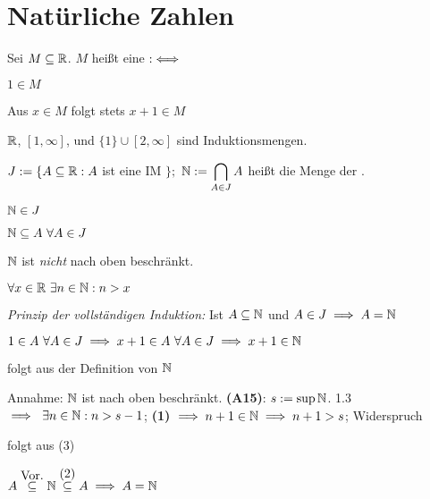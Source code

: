 \documentclass[a4paper,twoside,DIV15,BCOR12mm]{scrbook}
\begin{document}
\chapter{Natürliche Zahlen}

\begin{definition}[Induktionsmengen]
Sei $M \subseteq \mathbb{R}$. $M$ heißt eine   $:\iff$
\begin{liste}
\item $1 \in M$
\item Aus $x \in M$ folgt stets $x+1 \in M$
\end{liste}
\end{definition}

\begin{beispiel} $\mathbb{R}$, $[1,\infty]$, und $\{1\} \cup [2,\infty]$ sind Induktionsmengen.

$J:=\{A \subseteq \mathbb{R}: A$ ist eine IM $\};$ $\mathbb{N} := \displaystyle\bigcap_{ A\in J} A$  heißt die Menge der .
\end{beispiel}

\begin{satz}[Induktionsmengen]
\begin{liste}
\item $\mathbb{N} \in J$
\item $\mathbb{N} \subseteq A \ \forall A \in J$
\item $\mathbb{N}$ ist \textit{nicht} nach oben beschränkt.
\item $\forall x  \in \mathbb{R} \ \exists n \in \mathbb{N}: n > x $
\item \textit{Prinzip der vollständigen Induktion:} Ist $A \subseteq \mathbb{N}$ und $A \in J\implies A = \mathbb{N}$
\end{liste}
\end{satz}

\begin{beweis}
\begin{liste}
\item $1 \in A \ \forall A \in J \implies x + 1 \in A \ \forall A \in J \implies x+1 \in \mathbb{N}$
\item folgt aus der Definition von $\mathbb{N}$
\item Annahme: $\mathbb{N}$ ist nach oben beschränkt. \textbf{(A15)}: $s := \sup{\ensuremath{\mathbb{N}}}$. 1.3 $\implies \ \exists n \in\mathbb{N}: n > s - 1$; \textbf{(1)} $\implies n+1 \in \mathbb{N} \implies n+1 > s$; Widerspruch
\item folgt aus (3)
\item $A \stackrel{\mbox{Vor.}}{\subseteq} \mathbb{N} \stackrel{\mbox{(2)}}{\subseteq} A \implies A = \mathbb{N}$
\end{liste}
\end{beweis}
\end{document}
